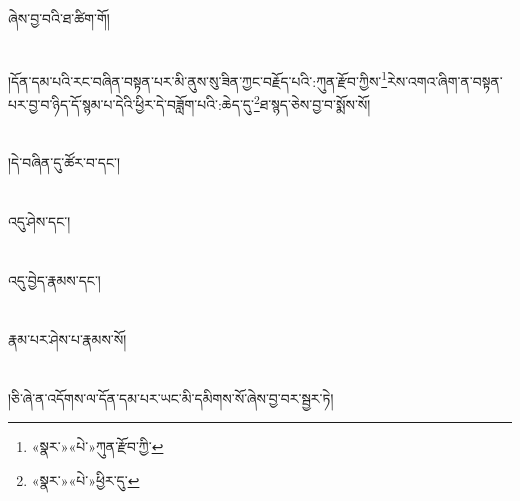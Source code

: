 ཞེས་བྱ་བའི་ཐ་ཚིག་གོ།\chapter{ }།དོན་དམ་པའི་རང་བཞིན་བསྟན་པར་མི་ནུས་སུ་ཟིན་ཀྱང་བརྗོད་པའི་:ཀུན་རྫོབ་ཀྱིས་\footnote{«སྣར་»«པེ་»ཀུན་རྫོབ་ཀྱི་}རེས་འགའ་ཞིག་ན་བསྟན་པར་བྱ་བ་ཉིད་དོ་སྙམ་པ་དེའི་ཕྱིར་དེ་བཟློག་པའི་:ཆེད་དུ་\footnote{«སྣར་»«པེ་»ཕྱིར་དུ་}ཐ་སྙད་ཅེས་བྱ་བ་སྨོས་སོ།\chapter{ }།དེ་བཞིན་དུ་ཚོར་བ་དང་།\chapter{ }འདུ་ཤེས་དང་།\chapter{ }འདུ་བྱེད་རྣམས་དང་།\chapter{ }རྣམ་པར་ཤེས་པ་རྣམས་སོ།\chapter{ }།ཅི་ཞེ་ན་འདོགས་ལ་དོན་དམ་པར་ཡང་མི་དམིགས་སོ་ཞེས་བྱ་བར་སྦྱར་ཏེ།\chapte
